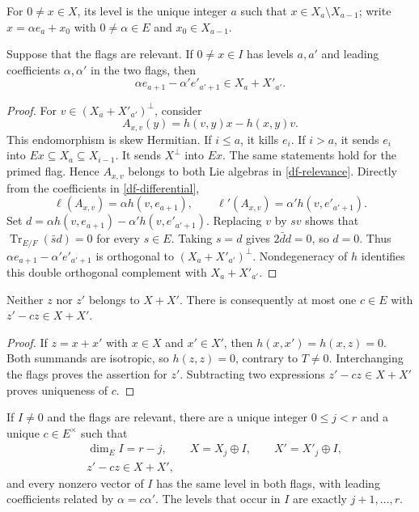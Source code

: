 For $0\ne x\in X$, its level is the unique integer $a$ such that
$x\in X_a\setminus X_{a-1}$; write
$x=\alpha e_a+x_0$ with $0\ne\alpha\in E$ and $x_0\in X_{a-1}$.

\begin{lemma}\label{df-successor}
Suppose that the flags are relevant.  If $0\ne x\in I$ has levels
$a,a'$ and leading coefficients $\alpha,\alpha'$ in the two flags,
then
\begin{equation}\label{df-successor-eq}
 \alpha e_{a+1}-\alpha'e'_{a'+1}\in X_a+X'_{a'}.
\end{equation}
\end{lemma}

\begin{proof}
For $v\in(X_a+X'_{a'})^\perp$, consider
\[
 A_{x,v}(y)=h(v,y)x-h(x,y)v.
\]
This endomorphism is skew Hermitian.  If $i\leq a$, it kills $e_i$.
If $i>a$, it sends $e_i$ into $Ex\subseteq X_a\subseteq X_{i-1}$.
It sends $X^\perp$ into $Ex$.  The same statements hold for the
primed flag.  Hence $A_{x,v}$ belongs to both Lie algebras in
\eqref{df-relevance}.  Directly from the coefficients in
\eqref{df-differential},
\[
 \ell(A_{x,v})=\alpha h(v,e_{a+1}),\qquad
 \ell'(A_{x,v})=\alpha'h(v,e'_{a'+1}).
\]
Set $d=\alpha h(v,e_{a+1})-\alpha'h(v,e'_{a'+1})$.
Replacing $v$ by $sv$ shows that
$\operatorname{Tr}_{E/F}(\bar s d)=0$ for every $s\in E$.
Taking $s=d$ gives $2\bar d d=0$, so $d=0$.
Thus $\alpha e_{a+1}-\alpha'e'_{a'+1}$ is orthogonal to
$(X_a+X'_{a'})^\perp$.  Nondegeneracy of $h$ identifies this double
orthogonal complement with $X_a+X'_{a'}$.
\end{proof}

\begin{lemma}\label{df-negative-not-sum}
Neither $z$ nor $z'$ belongs to $X+X'$.  There is consequently at
most one $c\in E$ with $z'-cz\in X+X'$.
\end{lemma}

\begin{proof}
If $z=x+x'$ with $x\in X$ and $x'\in X'$, then
$h(x,x')=h(x,z)=0$.  Both summands are isotropic, so $h(z,z)=0$,
contrary to $T\ne0$.  Interchanging the flags proves the assertion
for $z'$.  Subtracting two expressions $z'-cz\in X+X'$ proves
uniqueness of $c$.
\end{proof}

\begin{lemma}\label{df-common-levels}
If $I\ne0$ and the flags are relevant, there are a unique integer
$0\leq j<r$ and a unique $c\in E^\times$ such that
\begin{align}
 &\dim_E I=r-j,\qquad X=X_j\oplus I,
       \qquad X'=X'_j\oplus I,\label{df-common-splits}\\
 &z'-cz\in X+X',\label{df-z-relation}
\end{align}
and every nonzero vector of $I$ has the same level in both flags,
with leading coefficients related by $\alpha=c\alpha'$.
The levels that occur in $I$ are exactly $j+1,\ldots,r$.
\end{lemma}

